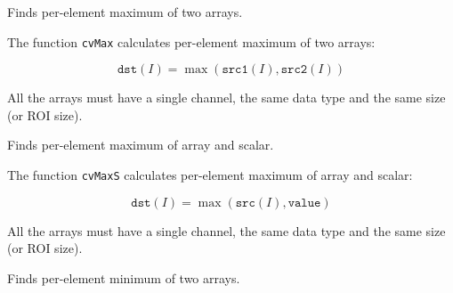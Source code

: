 \label{Max}

Finds per-element maximum of two arrays.


\begin{description}
\end{description}

The function \texttt{cvMax} calculates per-element maximum of two arrays:

\[
\texttt{dst}(I)=\max(\texttt{src1}(I), \texttt{src2}(I))
\]

All the arrays must have a single channel, the same data type and the same size (or ROI size).


\label{MaxS}

Finds per-element maximum of array and scalar.


\begin{description}
\end{description}

The function \texttt{cvMaxS} calculates per-element maximum of array and scalar:

\[
\texttt{dst}(I)=\max(\texttt{src}(I), \texttt{value})
\]

All the arrays must have a single channel, the same data type and the same size (or ROI size).


\label{Min}

Finds per-element minimum of two arrays.


\begin{description}
\end{description}


